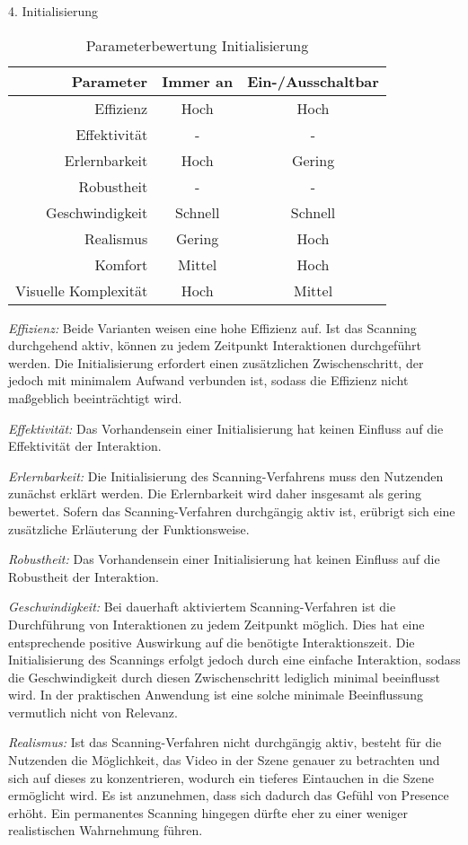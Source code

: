 4. Initialisierung 

\begin{table}[ht]
 \centering
 \begin{tabular}{r|c|c}
 Parameter & Immer an & Ein-/Ausschaltbar\\
 \hline
 Effizienz & Hoch & Hoch\\
 Effektivität & - & -\\
 Erlernbarkeit & Hoch & Gering\\
 Robustheit & - & -\\
 Geschwindigkeit & Schnell & Schnell\\
 Realismus & Gering & Hoch \\
 Komfort & Mittel & Hoch\\
 Visuelle Komplexität & Hoch & Mittel
 \end{tabular}
 \caption{Parameterbewertung Initialisierung}
 \label{tab:Initial}
\end{table}

\textit{Effizienz:}
Beide Varianten weisen eine hohe Effizienz auf. 
Ist das Scanning durchgehend aktiv, können zu jedem Zeitpunkt Interaktionen durchgeführt werden. Die Initialisierung erfordert einen zusätzlichen Zwischenschritt, der jedoch mit minimalem Aufwand verbunden ist, sodass die Effizienz nicht maßgeblich beeinträchtigt wird.

\textit{Effektivität:}
Das Vorhandensein einer Initialisierung hat keinen Einfluss auf die Effektivität der Interaktion.

\textit{Erlernbarkeit:}
Die Initialisierung des Scanning-Verfahrens muss den Nutzenden zunächst erklärt werden. Die Erlernbarkeit wird daher insgesamt als gering bewertet. Sofern das Scanning-Verfahren durchgängig aktiv ist, erübrigt sich eine zusätzliche Erläuterung der Funktionsweise.

\textit{Robustheit:}
Das Vorhandensein einer Initialisierung hat keinen Einfluss auf die Robustheit der Interaktion. 

\textit{Geschwindigkeit:}
Bei dauerhaft aktiviertem Scanning-Verfahren ist die Durchführung von Interaktionen zu jedem Zeitpunkt möglich. Dies hat eine entsprechende positive Auswirkung auf die benötigte Interaktionszeit. Die Initialisierung des Scannings erfolgt jedoch durch eine einfache Interaktion, sodass die Geschwindigkeit durch diesen Zwischenschritt lediglich minimal beeinflusst wird. In der praktischen Anwendung ist eine solche minimale Beeinflussung vermutlich nicht von Relevanz. 
 
\textit{Realismus:}
Ist das Scanning-Verfahren nicht durchgängig aktiv, besteht für die Nutzenden die Möglichkeit, das Video in der Szene genauer zu betrachten und sich auf dieses zu konzentrieren, wodurch ein tieferes Eintauchen in die Szene ermöglicht wird. Es ist anzunehmen, dass sich dadurch das Gefühl von Presence erhöht. Ein permanentes Scanning hingegen dürfte eher zu einer weniger realistischen Wahrnehmung führen. 

